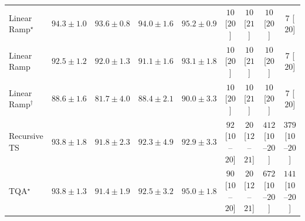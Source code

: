 \begin{tabular}{l|cccc|cccc|}
Linear Ramp$^\star$ & {\cellcolor[HTML]{034A74}} \color[HTML]{F1F1F1} $94.3\pm 1.0$ & {\cellcolor[HTML]{034E7B}} \color[HTML]{F1F1F1} $93.6\pm 0.8$ & {\cellcolor[HTML]{034C78}} \color[HTML]{F1F1F1} $94.0\pm 1.6$ & {\cellcolor[HTML]{03456C}} \color[HTML]{F1F1F1} $95.2\pm 0.9$ & {\cellcolor[HTML]{FFF6F2}} \color[HTML]{000000} $10$ [$20$] & {\cellcolor[HTML]{FFF6F2}} \color[HTML]{000000} $10$ [$21$] & {\cellcolor[HTML]{FFF6F2}} \color[HTML]{000000} $10$ [$20$] & {\cellcolor[HTML]{FFF6F2}} \color[HTML]{000000} $7$ [$20$] \\
Linear Ramp & {\cellcolor[HTML]{045585}} \color[HTML]{F1F1F1} $92.5\pm 1.2$ & {\cellcolor[HTML]{04588A}} \color[HTML]{F1F1F1} $92.0\pm 1.3$ & {\cellcolor[HTML]{045C90}} \color[HTML]{F1F1F1} $91.1\pm 1.6$ & {\cellcolor[HTML]{045280}} \color[HTML]{F1F1F1} $93.1\pm 1.8$ & {\cellcolor[HTML]{FFF6F2}} \color[HTML]{000000} $10$ [$20$] & {\cellcolor[HTML]{FFF6F2}} \color[HTML]{000000} $10$ [$21$] & {\cellcolor[HTML]{FFF6F2}} \color[HTML]{000000} $10$ [$20$] & {\cellcolor[HTML]{FFF6F2}} \color[HTML]{000000} $7$ [$20$] \\
Linear Ramp$^\dagger$ & {\cellcolor[HTML]{0566A0}} \color[HTML]{F1F1F1} $88.6\pm 1.6$ & {\cellcolor[HTML]{2C89BD}} \color[HTML]{F1F1F1} $81.7\pm 4.0$ & {\cellcolor[HTML]{0567A2}} \color[HTML]{F1F1F1} $88.4\pm 2.1$ & {\cellcolor[HTML]{046198}} \color[HTML]{F1F1F1} $90.0\pm 3.3$ & {\cellcolor[HTML]{FFF6F2}} \color[HTML]{000000} $10$ [$20$] & {\cellcolor[HTML]{FFF6F2}} \color[HTML]{000000} $10$ [$21$] & {\cellcolor[HTML]{FFF6F2}} \color[HTML]{000000} $10$ [$20$] & {\cellcolor[HTML]{FFF6F2}} \color[HTML]{000000} $7$ [$20$] \\
Recursive TS & {\cellcolor[HTML]{034D79}} \color[HTML]{F1F1F1} $93.8\pm 1.8$ & {\cellcolor[HTML]{04598C}} \color[HTML]{F1F1F1} $91.8\pm 2.3$ & {\cellcolor[HTML]{045687}} \color[HTML]{F1F1F1} $92.3\pm 4.9$ & {\cellcolor[HTML]{045382}} \color[HTML]{F1F1F1} $92.9\pm 3.3$ & {\cellcolor[HTML]{FDE2DF}} \color[HTML]{000000} $92$ [$10$--$20$] & {\cellcolor[HTML]{FFF3EF}} \color[HTML]{000000} $20$ [$12$--$21$] & {\cellcolor[HTML]{F15C9F}} \color[HTML]{F1F1F1} $412$ [$10$--$20$] & {\cellcolor[HTML]{F76EA3}} \color[HTML]{F1F1F1} $379$ [$10$--$20$] \\
TQA$^\star$ & {\cellcolor[HTML]{034D79}} \color[HTML]{F1F1F1} $93.8\pm 1.3$ & {\cellcolor[HTML]{045B8F}} \color[HTML]{F1F1F1} $91.4\pm 1.9$ & {\cellcolor[HTML]{045585}} \color[HTML]{F1F1F1} $92.5\pm 3.2$ & {\cellcolor[HTML]{03466E}} \color[HTML]{F1F1F1} $95.0\pm 1.8$ & {\cellcolor[HTML]{FDE2DF}} \color[HTML]{000000} $90$ [$10$--$20$] & {\cellcolor[HTML]{FFF3EF}} \color[HTML]{000000} $20$ [$12$--$21$] & {\cellcolor[HTML]{7F0178}} \color[HTML]{F1F1F1} $672$ [$10$--$20$] & {\cellcolor[HTML]{FDD4D0}} \color[HTML]{000000} $141$ [$10$--$20$] \\

\end{tabular}
